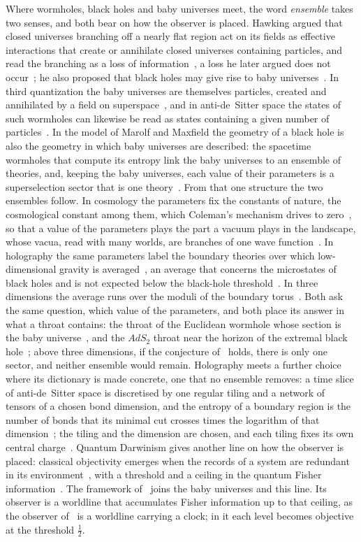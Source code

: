 \documentclass[11pt,reqno]{amsart}
\numberwithin{equation}{section}
\theoremstyle{remark}
\begin{document}
Where wormholes, black holes and baby universes meet, the word \emph{ensemble} takes two senses,
and both bear on how the observer is placed. Hawking argued that
closed universes branching off a nearly flat region act on its fields as effective interactions that
create or annihilate closed universes containing particles, and read the branching as a loss of
information~\cite{Haw88}, a loss he later argued does not occur~\cite{Haw05}; he also proposed that
black holes may give rise to baby universes~\cite{Haw93}. In third quantization the baby universes are
themselves particles, created and annihilated by a field on superspace~\cite{GS89}, and in
anti-de~Sitter space the states of such wormholes can likewise be read as states containing a given
number of particles~\cite{BG98}. In the model of Marolf and Maxfield the geometry of a black hole is
also the geometry in which baby universes are described: the spacetime wormholes that compute its
entropy link the baby universes to an ensemble of theories, and, keeping the baby universes, each
value of their parameters is a superselection sector that is one theory~\cite{MM20}. From that one
structure the two ensembles follow. In cosmology the parameters fix the constants of nature, the
cosmological constant among them, which Coleman's mechanism drives to zero~\cite{GS88,GS89,Col88}, so
that a value of the parameters plays the part a vacuum plays in the landscape, whose vacua, read with
many worlds, are branches of one wave function~\cite{BS12}. In holography the same parameters label
the boundary theories over which low-dimensional gravity is averaged~\cite{SSS19}, an average that
concerns the microstates of black holes and is not expected below the black-hole
threshold~\cite{SW22}. In three dimensions the average runs over the moduli of the boundary torus~\cite{MW20,ACHT21}. Both ask the same question, which value of the parameters, and both place its
answer in what a throat contains: the throat of the Euclidean wormhole whose section is the baby
universe~\cite{GS88,Col88}, and the $AdS_2$ throat near the horizon of the extremal black
hole~\cite{SSS19}; above three dimensions, if the conjecture of~\cite{MV20} holds, there is only one
sector, and neither ensemble would remain. Holography meets a further choice where its dictionary is made concrete, one that no ensemble removes: a time slice of anti-de~Sitter space is discretised by one regular tiling and a network of tensors of a chosen bond dimension, and the entropy of a boundary region is the number of bonds that its minimal cut crosses times the logarithm of that dimension~\cite{Swi12,PYHP15,JE21}; the tiling and the dimension are chosen, and each tiling fixes its own central charge~\cite{JZE20,BDF20}. Quantum Darwinism gives
another line on how the observer is placed: classical objectivity emerges when the records of a system are redundant in its
environment~\cite{Zur09}, with a threshold and a ceiling in the quantum Fisher
information~\cite{Kie26}. The framework of~\cite{CW6} joins the baby universes and this line. Its observer is a worldline that
accumulates Fisher information up to that ceiling, as the observer of~\cite{CLPW23} is a worldline
carrying a clock; in it each level becomes objective at the threshold $\tfrac12$.
\end{document}
